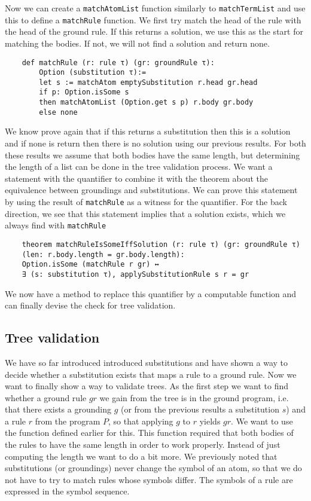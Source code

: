 Now we can create a \texttt{matchAtomList} function similarly to \texttt{matchTermList} and use this to define a \texttt{matchRule} function. We first try match the head of the rule with the head of the ground rule. If this returns a solution, we use this as the start for matching the bodies. If not, we will not find a solution and return none.

\begin{lstlisting}
    def matchRule (r: rule τ) (gr: groundRule τ):
        Option (substitution τ):=
        let s := matchAtom emptySubstitution r.head gr.head
        if p: Option.isSome s
        then matchAtomList (Option.get s p) r.body gr.body
        else none

\end{lstlisting}

We know prove again that if this returns a substitution then this is a solution and if none is return then there is no solution using our previous results. For both these results we assume that both bodies have the same length, but determining the length of a list can be done in the tree validation process.
We want a statement with the quantifier to combine it with the theorem about the equivalence between groundings and substitutions. We can prove this statement by using the result of \texttt{matchRule} as a witness for the quantifier. For the back direction, we see that this statement implies that a solution exists, which we always find with \texttt{matchRule}

\begin{lstlisting}
    theorem matchRuleIsSomeIffSolution (r: rule τ) (gr: groundRule τ) 
    (len: r.body.length = gr.body.length): 
    Option.isSome (matchRule r gr) ↔ 
    ∃ (s: substitution τ), applySubstitutionRule s r = gr
\end{lstlisting}

We now have a method to replace this quantifier by a computable function and can finally devise the check for tree validation.

\subsection{Tree validation}

We have so far introduced introduced substitutions and have shown a way to decide whether a substitution exists that maps a rule to a ground rule. Now we want to finally show a way to validate trees. As the first step we want to find whether a ground rule $gr$ we gain from the tree is in the ground program, i.e. that there exists a grounding $g$ (or from the previous results a substitution $s$) and a rule $r$ from the program $P$, so that applying $g$ to $r$ yields $gr$. We want to use the \matchRule function defined earlier for this. This function required that both bodies of the rules to have the same length in order to work properly. Instead of just computing the length we want to do a bit more. We previously noted that substitutions (or groundings) never change the symbol of an atom, so that we do not have to try to match rules whose symbols differ. The symbols of a rule are expressed in the symbol sequence.

